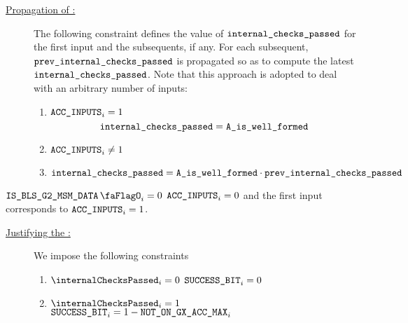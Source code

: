 \begin{description}
    \item[\underline{Propagation of \locInternalChecksPassed:}]
          The following constraint defines the value of $\texttt{internal\_checks\_passed}$ for the first input and the subsequents, if any.
          For each subsequent, $\texttt{prev\_}\texttt{internal\_checks\_passed}$ is propagated so as to compute the latest $\texttt{internal\_checks\_passed}$.
          Note that this approach is adopted to deal with an arbitrary number of inputs:
          \begin{enumerate}
              \item \If $\texttt{ACC\_INPUTS}_{i} = 1$ \Then
                    \[
                        \texttt{internal\_checks\_passed} = \texttt{A\_is\_well\_formed} 
                    \]
              \item \If $\texttt{ACC\_INPUTS}_{i} \neq 1$ \Then
                    \item $\texttt{internal\_checks\_passed} = \texttt{A\_is\_well\_formed} \cdot \texttt{prev\_}\texttt{internal\_checks\_passed}$
          \end{enumerate}
\end{description}
\saNote{} \If $\isBlsGTwoMsmData_{i} = 0$ \Then $\texttt{ACC\_INPUTS}_{i} = 0$ and the first input corresponds to $\texttt{ACC\_INPUTS}_{i} = 1$.
\begin{description}
    \item[\underline{Justifying the \blsSuccessBit{}:}]
          We impose the following constraints
          \begin{enumerate}
              \item \If $\internalChecksPassed _{i}= 0$ \Then $\texttt{SUCCESS\_BIT} _{i} = 0$
              \item \If $\internalChecksPassed _{i}= 1$  \Then $\texttt{SUCCESS\_BIT}_{i} = 1 - \texttt{NOT\_ON\_GX\_ACC\_MAX} _{i}$
          \end{enumerate}
\end{description}